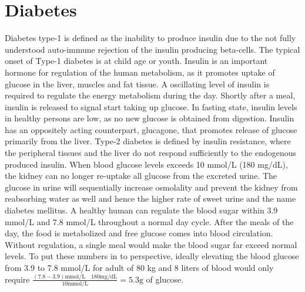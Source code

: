 \section{Diabetes}
Diabetes type-1 is defined as the inability to produce insulin due to the not fully understood auto-immune rejection of the insulin producing beta-cells. The typical onset of Type-1 diabetes is at child age or youth. Insulin is an important hormone for regulation of the human metabolism, as it promotes uptake of glucose in the liver, muscles and fat tissue. A oscillating level of insulin is required to regulate the energy metabolism during the day. Shortly after a meal, insulin is released to signal start taking up glucose. In fasting state, insulin levels in healthy persons are low, as no new glucose is obtained from digestion. Insulin has an oppositely acting counterpart, glucagone, that promotes release of glucose primarily from the liver. Type-2 diabetes is defined by insulin resistance, where the peripheral tissues and the liver do not respond sufficiently to the endogenous produced insulin. When blood glucose levels exceeds 10 mmol/L (180 mg/dL), the kidney can no longer re-uptake all glucose from the excreted urine. The glucose in urine will sequentially increase osmolality and prevent the kidney from reabsorbing water as well and hence the higher rate of sweet urine and the name diabetes mellitus. A healthy human can regulate the blood sugar within 3.9 mmol/L and 7.8 mmol/L throughout a normal day cycle. After the meals of the day, the food is metabolized and free glucose comes into blood circulation. Without regulation, a single meal would make the blood sugar far exceed normal levels\cite{silverthorn2010human,Cowart1990}.
To put these numbers in to perspective, ideally elevating the blood glucose from 3.9 to 7.8 mmol/L for adult of 80 kg and 8 liters of blood would only require
$ \frac { (7.8-3.9) \textrm{mmol/L} \quad 180\textrm{mg/dL} }
		{ 10 \textrm{mmol/L} } = 5.3 \textrm{g}$ of glucose.

